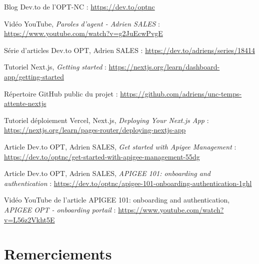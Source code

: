 \documentclass[12pt,a4paper]{report}
\begin{document}
\renewcommand{\bibname}{Ressources}
\begin{thebibliography}{9}

Blog Dev.to de l'OPT-NC : 
\url{https://dev.to/optnc}
\vspace{0.5cm}

Vidéo YouTube, \textit{Paroles d'agent - Adrien SALES} :
\url{https://www.youtube.com/watch?v=g2JuEcwPvgE}
\vspace{0.5cm}

Série d'articles Dev.to OPT, Adrien SALES :
\url{https://dev.to/adriens/series/18414}
\vspace{0.5cm}

Tutoriel Next.js, \textit{Getting started} :
\url{https://nextjs.org/learn/dashboard-app/getting-started}
\vspace{0.5cm}

Répertoire GitHub public du projet :
\url{https://github.com/adriens/unc-temps-attente-nextjs}
\vspace{0.5cm}

Tutoriel déploiement Vercel, Next.js,  \textit{Deploying Your Next.js App} :
\url{https://nextjs.org/learn/pages-router/deploying-nextjs-app}
\vspace{0.5cm}

Article Dev.to OPT, Adrien SALES,  \textit{Get started with Apigee Management} :
\url{https://dev.to/optnc/get-started-with-apigee-management-55dg}
\vspace{0.5cm}


Article Dev.to OPT, Adrien SALES, \textit{APIGEE
101: onboarding and authentication} :
\url{https://dev.to/optnc/apigee-101-onboarding-authentication-1ghl}
\vspace{0.5cm}

Vidéo YouTube de l'article APIGEE
101: onboarding and authentication, \textit{APIGEE OPT - onboarding portail} :
\url{https://www.youtube.com/watch?v=L56z2Vkht5E}
\vspace{0.5cm}

\end{thebibliography}
\newpage

\chapter*{Remerciements}
\end{document}
